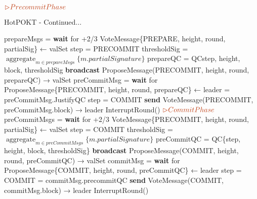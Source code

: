 \documentclass[a4paper]{article}
\DeclareMathOperator*{\aggregate}{aggregate}
\begin{document}
\begin{algorithm}
    \bigskip
    \newline ${\color{Bittersweet} {\rhd Precommit Phase}}$
    \caption{HotPOKT - Continued...}
      \begin{algorithmic}
            \State prepareMsgs = \textbf{wait} for {+2/3} VoteMessage\{\textsc{PREPARE}, height, round, partialSig\} ← valSet
            \State step = PRECOMMIT
            \State thresholdSig = ${\aggregate_{m \in prepareMsgs} \{m.partialSignature\}}$
            \State prepareQC = QC{step, height, block, thresholdSig}
            \State \textbf{broadcast} ProposeMessage(PRECOMMIT, height, round, prepareQC) → valSet
        \Else \quad {\color{Gray} { // IsReplica}}
          \State preCommitMsg = \textbf{wait} for ProposeMessage\{PRECOMMIT, height, round, prepareQC\} ← leader
             = preCommitMsg.JustifyQC
            \State step = COMMIT
            \State \textbf{send} VoteMessage(PRECOMMIT, preCommitMsg.block) → leader
          \Else
            \State InterruptRound()
          \EndIf
        \EndIf
      \vspace {5 mm}
      \newline ${\color{Bittersweet} {\rhd Commit Phase}}$
          \State preCommitMsgs = \textbf{wait} for {+2/3} VoteMessage\{\textsc{PRECOMMIT}, height, round, partialSig\} ← valSet
          \State step = COMMIT
          \State thresholdSig = ${\aggregate_{m \in preCommitMsgs} \{m.partialSignature\}}$
          \State preCommitQC = QC\{step, height, block, thresholdSig\}
          \State \textbf{broadcast} ProposeMessage(COMMIT, height, round, preCommitQC) → valSet
        \Else \quad {\color{Gray} { // IsReplica}}
          \State commitMsg = \textbf{wait} for ProposeMessage\{COMMIT, height, round, preCommitQC\} ← leader
          \State step = COMMIT
             = commitMsg.precommitQC
            \State \textbf{send} VoteMessage(COMMIT, commitMsg.block) → leader
          \Else
            \State InterruptRound()
          \EndIf
        \EndIf
        \State

\end{algorithmic}
\end{algorithm}
\end{document}
